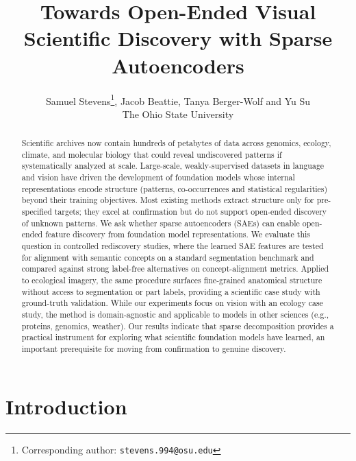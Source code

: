 \documentclass[10pt,twocolumn,letterpaper]{article}
\title{Towards Open-Ended Visual Scientific Discovery with Sparse Autoencoders}
\author{Samuel Stevens\thanks{Corresponding author: \texttt{stevens.994@osu.edu}}, Jacob Beattie, Tanya Berger-Wolf and Yu Su\\
The Ohio State University
}
\begin{document}
\maketitle

\begin{abstract}
Scientific archives now contain hundreds of petabytes of data across genomics, ecology, climate, and molecular biology that could reveal undiscovered patterns if systematically analyzed at scale.
Large-scale, weakly-supervised datasets in language and vision have driven the development of foundation models whose internal representations encode structure (patterns, co-occurrences and statistical regularities) beyond their training objectives.
Most existing methods extract structure only for pre-specified targets; they excel at confirmation but do not support open-ended discovery of unknown patterns.
We ask whether sparse autoencoders (SAEs) can enable open-ended feature discovery from foundation model representations.
We evaluate this question in controlled rediscovery studies, where the learned SAE features are tested for alignment with semantic concepts on a standard segmentation benchmark and compared against strong label-free alternatives on concept-alignment metrics.
Applied to ecological imagery, the same procedure surfaces fine-grained anatomical structure without access to segmentation or part labels, providing a scientific case study with ground-truth validation.
While our experiments focus on vision with an ecology case study, the method is domain-agnostic and applicable to models in other sciences (e.g., proteins, genomics, weather).
Our results indicate that sparse decomposition provides a practical instrument for exploring what scientific foundation models have learned, an important prerequisite for moving from confirmation to genuine discovery.
\end{abstract}

\section{Introduction}
\end{document}
